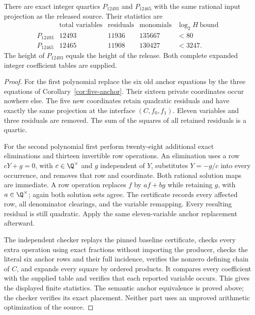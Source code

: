 \begin{proposition}\label{prop:computed-quartics}
There are exact integer quartics $P_{12493}$ and $P_{12465}$ with
the same rational input projection as the released source. Their
statistics are
\[
\begin{array}{c|r|r|r|r}
 &\text{total variables}&\text{residuals}&\text{monomials}&\log_2 H\ \text{bound}\\\hline
 P_{12493}&12493&11936&135667&<80\\
 P_{12465}&12465&11908&130427&<3247.
\end{array}
\]
The height of $P_{12493}$ equals the height of the release.
Both complete expanded integer coefficient tables are supplied.
\end{proposition}
\begin{proof}
For the first polynomial replace the six old anchor equations by
the three equations of Corollary~\ref{cor:five-anchor}. Their sixteen
private coordinates occur nowhere else. The five new coordinates
retain quadratic residuals and have exactly the same projection at the
interface $(C,f_0,f_1)$. Eleven variables and three residuals are removed.
The sum of the squares of all retained residuals is a quartic.

For the second polynomial first perform twenty-eight additional exact
eliminations and thirteen invertible row operations. An elimination
uses a row $cY+g=0$, with $c\in\Q^\times$ and $g$ independent of
$Y$, substitutes $Y=-g/c$ into every occurrence, and removes that row
and coordinate. Both rational solution maps are immediate. A row
operation replaces $f$ by $af+bg$ while retaining $g$, with
$a\in\Q^\times$; again both solution sets agree. The certificate
records every affected row, all denominator clearings, and the variable
remapping. Every resulting residual is still quadratic. Apply the same
eleven-variable anchor replacement afterward.

The independent checker replays the pinned baseline certificate, checks
every extra operation using exact fractions without importing the
producer, checks the literal six anchor rows and their full incidence,
verifies the nonzero defining chain of $C$, and expands every square
by ordered products. It compares every coefficient with the supplied
table and verifies that each reported variable occurs. This gives the
displayed finite statistics. The semantic anchor equivalence is proved
above; the checker verifies its exact placement. Neither part uses an
unproved arithmetic optimization of the source.
\end{proof}

